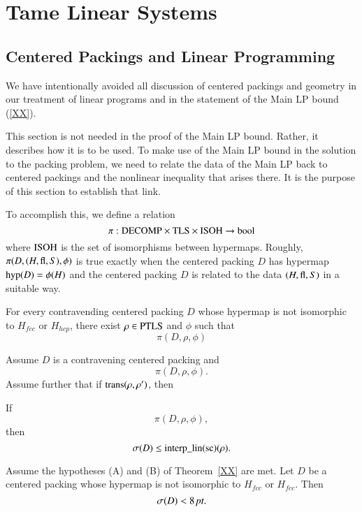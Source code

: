 \chapter{Tame Linear Systems}

\section{Centered Packings and Linear Programming}

We have intentionally avoided all discussion of centered packings
and geometry in our treatment of linear programs and in the
statement of the Main LP bound (\ref{XX}).

This section is not needed in the proof of the Main LP bound.
Rather, it describes how it is to be used.  To make use of the
Main LP bound in the solution to the packing problem, 
we need to relate the data
of the Main LP back to centered packings and the nonlinear
inequality that arises there.  It is the purpose of this section
to establish that link.

To accomplish this, we define a relation
    $$\pi:{\operatorname{DECOMP}}\times {\operatorname{TLS}}\times {\operatorname{ISOH}}
    \to\operatorname{bool}$$
where ${\operatorname{ISOH}}$ is the set of isomorphisms between hypermaps.
Roughly, $\pi(D,(H,{\operatorname{fl}},S),\phi)$ is true exactly when the
centered packing $D$ has hypermap ${\operatorname{hyp}}(D) =\phi(H)$ and the
centered packing $D$ is related to the data $(H,{\operatorname{fl}},S)$ in a
suitable way.

\begin{theorem}  For every contravending centered packing $D$
whose hypermap is not isomorphic to $H_{fcc}$ or $H_{hcp}$, there
exist $\rho\in{\operatorname{PTLS}}$ and $\phi$ such that
    $$\pi(D,\rho,\phi)$$
\end{theorem}

\begin{theorem}
Assume $D$ is a contravening centered packing and
    $$
    \pi(D,\rho,\phi).
    $$
Assume further that if ${\operatorname{trans}}(\rho,\rho')$, then

    If
    $$\pi(D,\rho,\phi),$$
    then
    $$\sigma(D) \le {\operatorname{interp\_lin}}({\operatorname{sc}})(\rho).$$
\end{theorem}

\begin{corollary}
Assume the hypotheses (A) and (B) of Theorem~\ref{XX} are met.  Let $D$
be a centered packing whose hypermap is not isomorphic to
$H_{fcc}$ or $H_{fcc}$.  Then
    $$\sigma(D) < 8\,\hbox{\it pt}.$$
\end{corollary}

